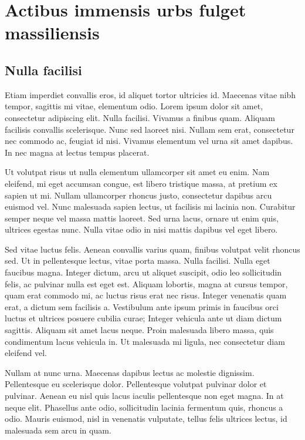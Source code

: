 \chapter{Actibus immensis urbs fulget massiliensis}

\section{Nulla facilisi}
Etiam imperdiet convallis eros, id aliquet tortor ultricies id. Maecenas vitae nibh tempor, sagittis mi vitae, elementum odio. Lorem ipsum dolor sit amet, consectetur adipiscing elit. Nulla facilisi. Vivamus a finibus quam. Aliquam facilisis convallis scelerisque. Nunc sed laoreet nisi. Nullam sem erat, consectetur nec commodo ac, feugiat id nisi. Vivamus elementum vel urna sit amet dapibus. In nec magna at lectus tempus placerat.

Ut volutpat risus ut nulla elementum ullamcorper sit amet eu enim. Nam eleifend, mi eget accumsan congue, est libero tristique massa, at pretium ex sapien ut mi. Nullam ullamcorper rhoncus justo, consectetur dapibus arcu euismod vel. Nunc malesuada sapien lectus, ut facilisis mi lacinia non. Curabitur semper neque vel massa mattis laoreet. Sed urna lacus, ornare ut enim quis, ultrices egestas nunc. Nulla vitae odio in nisi mattis dapibus vel eget libero.

Sed vitae luctus felis. Aenean convallis varius quam, finibus volutpat velit rhoncus sed. Ut in pellentesque lectus, vitae porta massa. Nulla facilisi. Nulla eget faucibus magna. Integer dictum, arcu ut aliquet suscipit, odio leo sollicitudin felis, ac pulvinar nulla est eget est. Aliquam lobortis, magna at cursus tempor, quam erat commodo mi, ac luctus risus erat nec risus. Integer venenatis quam erat, a dictum sem facilisis a. Vestibulum ante ipsum primis in faucibus orci luctus et ultrices posuere cubilia curae; Integer vehicula ante ut diam dictum sagittis. Aliquam sit amet lacus neque. Proin malesuada libero massa, quis condimentum lacus vehicula in. Ut malesuada mi ligula, nec consectetur diam eleifend vel.

Nullam at nunc urna. Maecenas dapibus lectus ac molestie dignissim. Pellentesque eu scelerisque dolor. Pellentesque volutpat pulvinar dolor et pulvinar. Aenean eu nisl quis lacus iaculis pellentesque non eget magna. In at neque elit. Phasellus ante odio, sollicitudin lacinia fermentum quis, rhoncus a odio. Mauris euismod, nisl in venenatis vulputate, tellus felis ultrices lectus, id malesuada sem arcu in quam.

